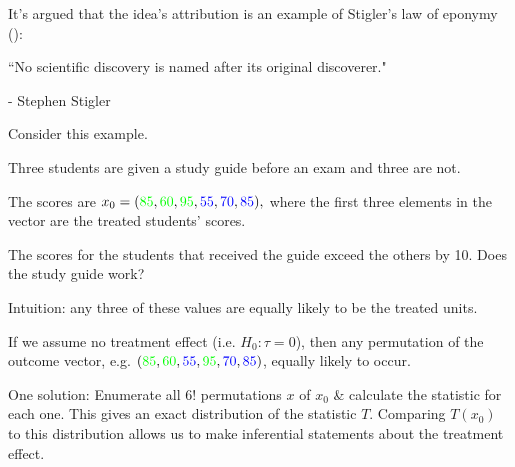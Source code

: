 \documentclass[notes,11pt, aspectratio=169]{beamer}
\newenvironment{wideitemize}{\itemize\addtolength{\itemsep}{10pt}}{\enditemize}
\begin{document}
\begin{frame}
    
        It's argued that the idea's attribution is an example of
        Stigler's law of eponymy (\cite{onghena_randomization_2017}):

        
      \begin{block}{}
        ``No scientific discovery is named after its original discoverer."
      \end{block}

    
      \begin{flushright}
        - Stephen Stigler
      \end{flushright}
      
\end{frame}

\begin{frame}
    
    Consider this example.
   
    \medskip
    
    \begin{wideitemize}
        \item Three students are given a study guide before an exam and three are not.
        \item The scores are \(x_0 = (\textcolor{green}{85}, \textcolor{green}{60}, \textcolor{green}{95}, \textcolor{blue}{55}, \textcolor{blue}{70}, \textcolor{blue}{85}),\)
        where the first three
        elements in the vector are the treated students' scores.
    \end{wideitemize}

    \bigskip
    
    The scores for the students that received the guide exceed the others by 10.
    Does the study guide work? \pause 
    
    \medskip

    Intuition: any three of these values are equally likely to be the treated units. 
    
    If we assume no treatment effect (i.e. $H_0: \tau = 0$), then 
    any permutation of the outcome vector, e.g. $(\textcolor{green}{85}, \textcolor{green}{60}, \textcolor{blue}{55}, \textcolor{green}{95}, \textcolor{blue}{70}, \textcolor{blue}{85})$, 
    equally likely to occur.
    \pause 

    \medskip 
    
    One solution: Enumerate all $6!$ permutations $x$ of $x_0$ \& calculate the statistic for each
    one. This gives an exact distribution of the statistic $T$.
    Comparing $T(x_0)$ to this distribution allows us to make inferential statements about the
    treatment effect.

\end{frame}
\end{document}
